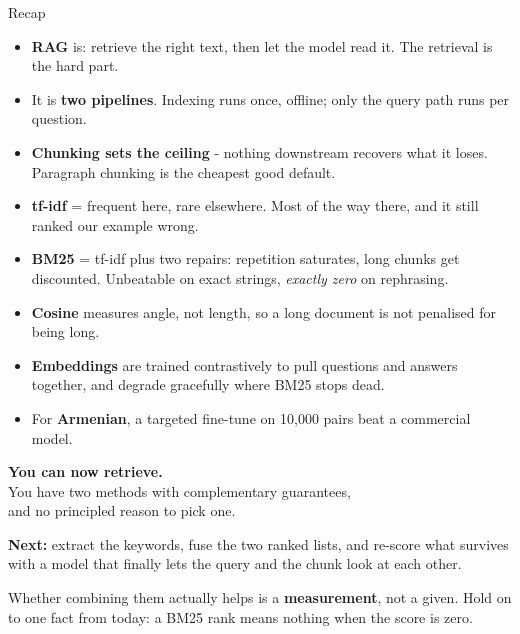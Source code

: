 \documentclass[aspectratio=169]{beamer}
\begin{document}
\begin{frame}{Recap}
  \vspace{0.3em}
  \small
  \begin{itemize}
    \item \textbf{RAG} is: retrieve the right text, then let the model read it. The
      retrieval is the hard part.
    \item It is \textbf{two pipelines}. Indexing runs once, offline; only the query path
      runs per question.
    \item \textbf{Chunking sets the ceiling} - nothing downstream recovers what it loses.
      Paragraph chunking is the cheapest good default.
    \item \textbf{tf-idf} = frequent here, rare elsewhere. Most of the way there, and it
      still ranked our example wrong.
    \item \textbf{BM25} = tf-idf plus two repairs: repetition saturates, long chunks get
      discounted. Unbeatable on exact strings, \emph{exactly zero} on rephrasing.
    \item \textbf{Cosine} measures angle, not length, so a long document is not penalised
      for being long.
    \item \textbf{Embeddings} are trained contrastively to pull questions and answers
      together, and degrade gracefully where BM25 stops dead.
    \item For \textbf{Armenian}, a targeted fine-tune on 10{,}000 pairs beat a commercial
      model.
  \end{itemize}

\end{frame}

\begin{frame}[plain]
  \vfill
  \begin{center}
    {\Large\bfseries\color{popblue} You can now retrieve.}\\[0.7em]
    {\large You have two methods with complementary guarantees,}\\[0.25em]
    {\large and no principled reason to pick one.}
  \end{center}

  \vspace{1.4em}
  \begin{center}
  \begin{tcolorbox}[colback=paramgreen!8, colframe=paramgreen, boxrule=0.8pt, arc=3pt,
                    width=0.82\textwidth]
    \begin{center}
      \textbf{Next:} extract the keywords, fuse the two ranked lists, and re-score what
      survives with a model that finally lets the query and the chunk look at each other.

      \vspace{0.5em}
      {\small Whether combining them actually helps is a \textbf{measurement}, not a given.
      Hold on to one fact from today: a BM25 rank means nothing when the score is zero.}
    \end{center}
  \end{tcolorbox}
  \end{center}
  \vfill
\end{frame}
\end{document}
